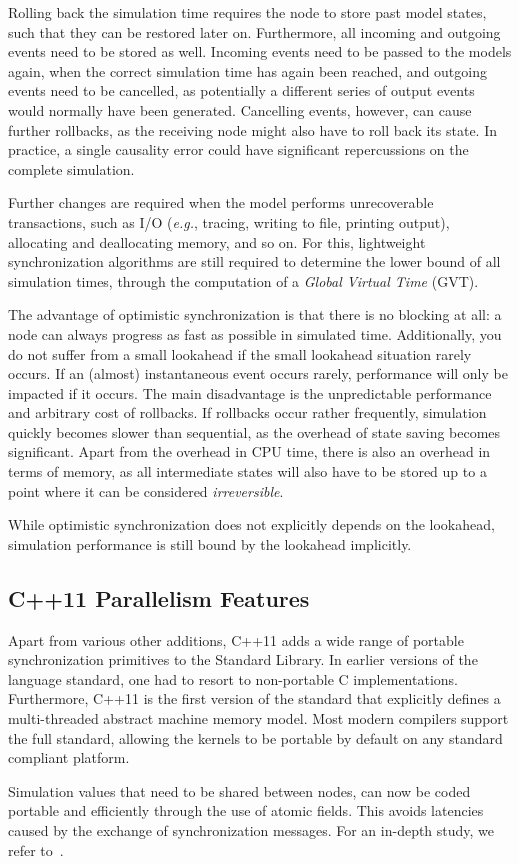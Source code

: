 Rolling back the simulation time requires the node to store past model states, such that they can be restored later on.
Furthermore, all incoming and outgoing events need to be stored as well.
Incoming events need to be passed to the models again, when the correct simulation time has again been reached, and outgoing events need to be cancelled, as potentially a different series of output events would normally have been generated.
Cancelling events, however, can cause further rollbacks, as the receiving node might also have to roll back its state.
In practice, a single causality error could have significant repercussions on the complete simulation.

Further changes are required when the model performs unrecoverable transactions, such as I/O (\textit{e.g.}, tracing, writing to file, printing output), allocating and deallocating memory, and so on.
For this, lightweight synchronization algorithms are still required to determine the lower bound of all simulation times, through the computation of a \textit{Global Virtual Time} (GVT).

The advantage of optimistic synchronization is that there is no blocking at all: a node can always progress as fast as possible in simulated time.
Additionally, you do not suffer from a small lookahead if the small lookahead situation rarely occurs.
If an (almost) instantaneous event occurs rarely, performance will only be impacted if it occurs.
The main disadvantage is the unpredictable performance and arbitrary cost of rollbacks.
If rollbacks occur rather frequently, simulation quickly becomes slower than sequential, as the overhead of state saving becomes significant.
Apart from the overhead in CPU time, there is also an overhead in terms of memory, as all intermediate states will also have to be stored up to a point where it can be considered \textit{irreversible}.

While optimistic synchronization does not explicitly depends on the lookahead, simulation performance is still bound by the lookahead implicitly.

\subsection{C++11 Parallelism Features}
Apart from various other additions, C++11 adds a wide range of portable synchronization primitives to the Standard Library.
In earlier versions of the language standard, one had to resort to non-portable C implementations.
Furthermore, C++11 is the first version of the standard that explicitly defines a multi-threaded abstract machine memory model.
Most modern compilers support the full standard, allowing the kernels to be portable by default on any standard compliant platform. 

Simulation values that need to be shared between nodes, can now be coded portable and efficiently through the use of atomic fields.
This avoids latencies caused by the exchange of synchronization messages.
For an in-depth study, we refer to~\cite{CPE:CPE3007}.
